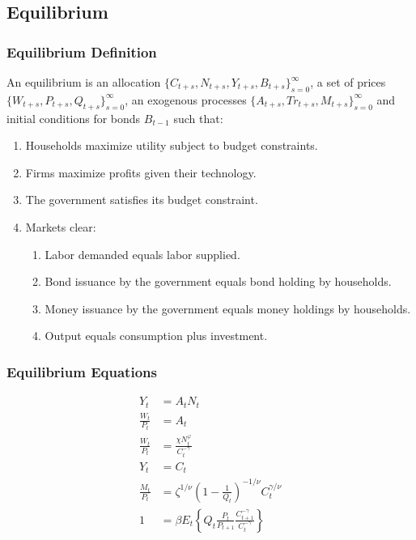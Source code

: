 \documentclass[english,xcolor=svgnames]{beamer}
\begin{document}
\subsection{Equilibrium}

\begin{frame}
\frametitle{Equilibrium Definition}
An equilibrium is an allocation $\{C_{t+s},N_{t+s},Y_{t+s},B_{t+s}\}_{s=0}^{\infty}$, a set of prices $\{W_{t+s},P_{t+s},Q_{t+s}\}_{s=0}^{\infty}$, an exogenous processes $\{A_{t+s},Tr_{t+s},M_{t+s}\}_{s=0}^{\infty}$ and initial conditions for bonds $B_{t-1}$ such that:
\begin{enumerate}[1.]
	\item Households maximize utility subject to budget constraints.
	\item Firms maximize profits given their technology.
	\item The government satisfies its budget constraint.
	\item Markets clear:
	\begin{enumerate}[3.1.]
		\item Labor demanded equals labor supplied.
		\item Bond issuance by the government equals bond holding by households.
		\item Money issuance by the government equals money holdings by households.
		\item Output equals consumption plus investment.
	\end{enumerate}
\end{enumerate}
\end{frame}


\begin{frame}
\frametitle{Equilibrium Equations}
\begin{align*}
	Y_t&=A_tN_{t}  \\
	\frac{W_t}{P_t}&= A_t  \\
	\frac{W_t}{P_t}&=\frac{\chi N_t^\varphi}{C_t^{-\gamma}} \\
	Y_t&=C_t \\
	\frac{M_t}{P_t}&=\zeta^{1/\nu}\left(1-\frac{1}{Q_t}\right)^{-1/\nu}C_{t}^{\gamma/\nu}\\
	1&=\beta E_t\left\{Q_t \frac{P_t}{P_{t+1}} \frac{C_{t+1}^{-\gamma}}{C_{t}^{-\gamma}}\right\} 
\end{align*}
\end{frame}

\end{document}
